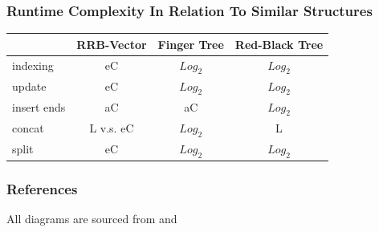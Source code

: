\documentclass{beamer}
\begin{document}
\begin{frame}
\frametitle{Runtime Complexity In Relation To Similar Structures}

	\begin{center}
	\begin{tabular}{| l || c | c | c |}
		\hline
		& RRB-Vector & Finger Tree & Red-Black Tree\\
		\hline
		indexing & eC & $ Log_2 $ & $ Log_2 $ \\
		update & eC & $ Log_2 $ & $ Log_2 $\\
		insert ends & aC & aC & $ Log_2 $\\
		concat & L v.s. eC & $ Log_2 $ & L\\
		split & eC & $ Log_2 $ & $ Log_2 $\\
		\hline
		\end{tabular}
	\end{center}

\end{frame}

\begin{frame}
\frametitle{References}

All diagrams are sourced from \cite{bagwell2011rrb} and \cite{stucki2015rrb}




\end{frame}
\end{document}
